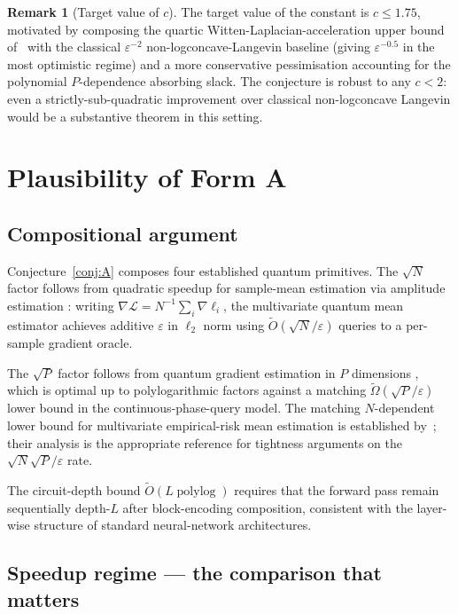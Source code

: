 \documentclass[11pt,a4paper]{article}
\theoremstyle{definition}
\newtheorem{remark}{Remark}
\DeclareMathOperator*{\polylog}{polylog}
\newcommand{\Otil}{\widetilde{O}}
\newcommand{\Omegatil}{\widetilde{\Omega}}
\newcommand{\veps}{\varepsilon}
\newcommand{\loss}{\mathcal{L}}
\begin{document}
\begin{remark}[Target value of $c$]\label{rem:c-target}
The target value of the constant is $c \le 1.75$, motivated by composing the quartic Witten-Laplacian-acceleration upper bound of~\cite{QuantumNonLogconcave2025} with the classical $\veps^{-2}$ non-logconcave-Langevin baseline (giving $\veps^{-0.5}$ in the most optimistic regime) and a more conservative pessimisation accounting for the polynomial $P$-dependence absorbing slack. The conjecture is robust to any $c < 2$: even a strictly-sub-quadratic improvement over classical non-logconcave Langevin would be a substantive theorem in this setting.
\end{remark}

\section{Plausibility of Form A}\label{sec:formA}

\subsection{Compositional argument}

Conjecture~\ref{conj:A} composes four established quantum primitives. The $\sqrt{N}$ factor follows from quadratic speedup for sample-mean estimation via amplitude estimation \cite{BHMT2002,Montanaro2015,CornelissenHamoudiJerbi2022}: writing $\nabla \loss = N^{-1}\sum_i \nabla\ell_i$, the multivariate quantum mean estimator achieves additive $\veps$ in $\ell_2$ norm using $\Otil(\sqrt{N}/\veps)$ queries to a per-sample gradient oracle.

The $\sqrt{P}$ factor follows from quantum gradient estimation in $P$ dimensions \cite{GAW2019}, which is optimal up to polylogarithmic factors against a matching $\Omegatil(\sqrt{P}/\veps)$ lower bound in the continuous-phase-query model. The matching $N$-dependent lower bound for multivariate empirical-risk mean estimation is established by~\cite{CornelissenHamoudiJerbi2022}; their analysis is the appropriate reference for tightness arguments on the $\sqrt{N}\sqrt{P}/\veps$ rate.

The circuit-depth bound $\Otil(L\polylog)$ requires that the forward pass remain sequentially depth-$L$ after block-encoding composition, consistent with the layer-wise structure of standard neural-network architectures.

\subsection{Speedup regime --- the comparison that matters}\label{sec:formA-regime}
\end{document}
